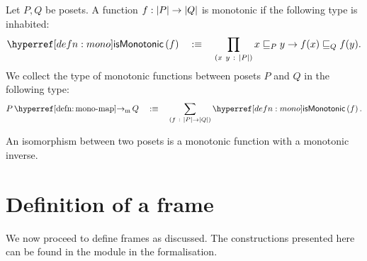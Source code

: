 \begin{defn}\label{defn:mono-map}
  Let $P, Q$ be posets. A function $f : \left| P \right| \rightarrow \left| Q \right|$ is monotonic if the following
  type is inhabited:
  \begin{equation*}
    \ismonotonic{f} \quad\is\quad \pity{x~y}{\abs{P}}{x \sqsubseteq_P y \rightarrow f(x) \sqsubseteq_Q f(y)}.
  \end{equation*}
  We collect the type of monotonic functions between posets $P$ and $Q$ in the following
  type:
  \begin{equation*}
    \mono{P}{Q} \quad\is\quad \sigmaty{f}{\abs{P} \rightarrow \abs{Q}}{\ismonotonic{f}}.
  \end{equation*}
\end{defn}

\begin{defn}\label{defn:poset-iso}
  An isomorphism between two posets is a monotonic function with a monotonic inverse.
\end{defn}

\section{Definition of a frame}\label{sec:frame}

We now proceed to define frames as discussed. The constructions presented here can be
found in the  module in the \veragda{} formalisation.

